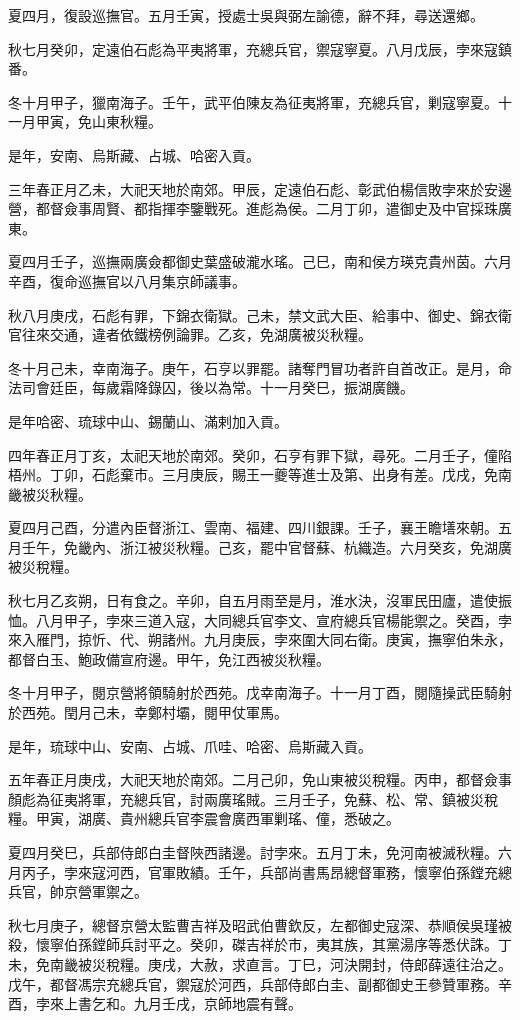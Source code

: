 \begin{pinyinscope}
夏四月，復設巡撫官。五月壬寅，授處士吳與弼左諭德，辭不拜，尋送還鄉。

秋七月癸卯，定遠伯石彪為平夷將軍，充總兵官，禦寇寧夏。八月戊辰，孛來寇鎮番。

冬十月甲子，獵南海子。壬午，武平伯陳友為征夷將軍，充總兵官，剿寇寧夏。十一月甲寅，免山東秋糧。

是年，安南、烏斯藏、占城、哈密入貢。

三年春正月乙未，大祀天地於南郊。甲辰，定遠伯石彪、彰武伯楊信敗孛來於安邊營，都督僉事周賢、都指揮李鑒戰死。進彪為侯。二月丁卯，遣御史及中官採珠廣東。

夏四月壬子，巡撫兩廣僉都御史葉盛破瀧水瑤。己巳，南和侯方瑛克貴州茵。六月辛酉，復命巡撫官以八月集京師議事。

秋八月庚戌，石彪有罪，下錦衣衛獄。己未，禁文武大臣、給事中、御史、錦衣衛官往來交通，違者依鐵榜例論罪。乙亥，免湖廣被災秋糧。

冬十月己未，幸南海子。庚午，石亨以罪罷。諸奪門冒功者許自首改正。是月，命法司會廷臣，每歲霜降錄囚，後以為常。十一月癸巳，振湖廣饑。

是年哈密、琉球中山、錫蘭山、滿剌加入貢。

四年春正月丁亥，太祀天地於南郊。癸卯，石亨有罪下獄，尋死。二月壬子，僮陷梧州。丁卯，石彪棄市。三月庚辰，賜王一夔等進士及第、出身有差。戊戌，免南畿被災秋糧。

夏四月己酉，分遣內臣督浙江、雲南、福建、四川銀課。壬子，襄王瞻墡來朝。五月壬午，免畿內、浙江被災秋糧。己亥，罷中官督蘇、杭織造。六月癸亥，免湖廣被災稅糧。

秋七月乙亥朔，日有食之。辛卯，自五月雨至是月，淮水決，沒軍民田廬，遣使振恤。八月甲子，孛來三道入寇，大同總兵官李文、宣府總兵官楊能禦之。癸酉，孛來入雁門，掠忻、代、朔諸州。九月庚辰，孛來圍大同右衛。庚寅，撫寧伯朱永，都督白玉、鮑政備宣府邊。甲午，免江西被災秋糧。

冬十月甲子，閱京營將領騎射於西苑。戊幸南海子。十一月丁酉，閱隨操武臣騎射於西苑。閏月己未，幸鄭村壩，閱甲仗軍馬。

是年，琉球中山、安南、占城、爪哇、哈密、烏斯藏入貢。

五年春正月庚戌，大祀天地於南郊。二月己卯，免山東被災稅糧。丙申，都督僉事顏彪為征夷將軍，充總兵官，討兩廣瑤賊。三月壬子，免蘇、松、常、鎮被災稅糧。甲寅，湖廣、貴州總兵官李震會廣西軍剿瑤、僮，悉破之。

夏四月癸巳，兵部侍郎白圭督陜西諸邊。討孛來。五月丁未，免河南被滅秋糧。六月丙子，孛來寇河西，官軍敗績。壬午，兵部尚書馬昂總督軍務，懷寧伯孫鏜充總兵官，帥京營軍禦之。

秋七月庚子，總督京營太監曹吉祥及昭武伯曹欽反，左都御史寇深、恭順侯吳瑾被殺，懷寧伯孫鏜師兵討平之。癸卯，磔吉祥於市，夷其族，其黨湯序等悉伏誅。丁未，免南畿被災稅糧。庚戌，大赦，求直言。丁巳，河決開封，侍郎薛遠往治之。戊午，都督馮宗充總兵官，禦寇於河西，兵部侍郎白圭、副都御史王參贊軍務。辛酉，孛來上書乞和。九月壬戌，京師地震有聲。


\end{pinyinscope}
